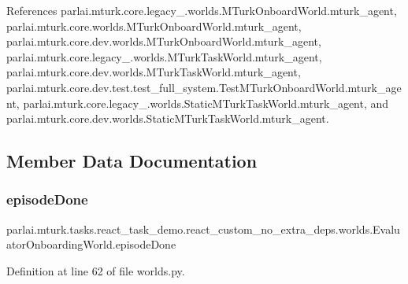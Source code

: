 References parlai.\+mturk.\+core.\+legacy\+\_.\+worlds.\+M\+Turk\+Onboard\+World.\+mturk\+\_\+agent, parlai.\+mturk.\+core.\+worlds.\+M\+Turk\+Onboard\+World.\+mturk\+\_\+agent, parlai.\+mturk.\+core.\+dev.\+worlds.\+M\+Turk\+Onboard\+World.\+mturk\+\_\+agent, parlai.\+mturk.\+core.\+legacy\+\_.\+worlds.\+M\+Turk\+Task\+World.\+mturk\+\_\+agent, parlai.\+mturk.\+core.\+dev.\+worlds.\+M\+Turk\+Task\+World.\+mturk\+\_\+agent, parlai.\+mturk.\+core.\+dev.\+test.\+test\+\_\+full\+\_\+system.\+Test\+M\+Turk\+Onboard\+World.\+mturk\+\_\+agent, parlai.\+mturk.\+core.\+legacy\+\_.\+worlds.\+Static\+M\+Turk\+Task\+World.\+mturk\+\_\+agent, and parlai.\+mturk.\+core.\+dev.\+worlds.\+Static\+M\+Turk\+Task\+World.\+mturk\+\_\+agent.



\subsection{Member Data Documentation}
\mbox{\label{classparlai_1_1mturk_1_1tasks_1_1react__task__demo_1_1react__custom__no__extra__deps_1_1worlds_1_1EvaluatorOnboardingWorld_a18ad4406ab6515684a860c6337d78351}} 
\subsubsection{\texorpdfstring{episode\+Done}{episodeDone}}
{\footnotesize\ttfamily parlai.\+mturk.\+tasks.\+react\+\_\+task\+\_\+demo.\+react\+\_\+custom\+\_\+no\+\_\+extra\+\_\+deps.\+worlds.\+Evaluator\+Onboarding\+World.\+episode\+Done}



Definition at line 62 of file worlds.\+py.



